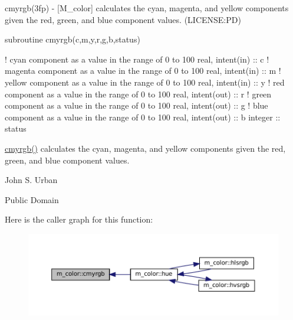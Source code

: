 \begin{DoxyDescription}
\item[\label{_CMYRGB}%
N\+A\+ME ]cmyrgb(3fp) -\/ \mbox{[}M\+\_\+color\mbox{]} calculates the cyan, magenta, and yellow components given the red, green, and blue component values. (L\+I\+C\+E\+N\+SE\+:PD) 


\item[S\+Y\+N\+O\+P\+S\+IS ]
\begin{DoxyPre}
    subroutine cmyrgb(c,m,y,r,g,b,status)\end{DoxyPre}



\begin{DoxyPre}     ! cyan component as a value in the range of 0 to 100
     real, intent(in)  :: c
     ! magenta component as a value in the range of 0 to 100
     real, intent(in)  :: m
     ! yellow component as a value in the range of 0 to 100
     real, intent(in)  :: y
     ! red component as a value in the range of 0 to 100
     real, intent(out) :: r
     ! green component as a value in the range of 0 to 100
     real, intent(out) :: g
     ! blue component as a value in the range of 0 to 100
     real, intent(out) :: b
     integer           :: status
    \end{DoxyPre}
 


\item[D\+E\+S\+C\+R\+I\+P\+T\+I\+ON ]\mbox{\hyperlink{namespacem__color_ab91687e87d0901874e52efe5933e3044}{cmyrgb()}} calculates the cyan, magenta, and yellow components given the red, green, and blue component values.




\item[A\+U\+T\+H\+OR ]

John S. Urban




\item[L\+I\+C\+E\+N\+SE ]

Public Domain




\end{DoxyDescription}Here is the caller graph for this function\+:\nopagebreak
\begin{figure}[H]
\begin{center}
\leavevmode
\includegraphics[width=350pt]{namespacem__color_ab91687e87d0901874e52efe5933e3044_icgraph}
\end{center}
\end{figure}
\mbox{\label{namespacem__color_a84a36043d278bc56a7148483a862dec8}} 
